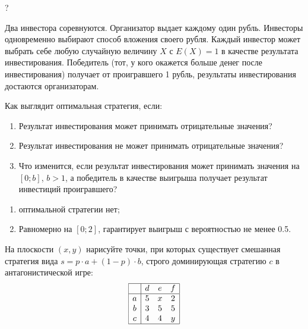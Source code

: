 \begin{problem}[Инвесторы.]
\begin{source}
\cite{ferguson:tn}?
\end{source}
Два инвестора соревнуются. Организатор выдает каждому один рубль. Инвесторы одновременно выбирают способ вложения своего рубля. Каждый инвестор может выбрать себе любую случайную величину $X$ с $E(X)=1$ в качестве результата инвестирования. Победитель (тот, у кого окажется больше денег после инвестирования) получает от проигравшего 1 рубль, результаты инвестирования достаются организаторам.

Как выглядит оптимальная стратегия, если:

\begin{enumerate}
\item Результат инвестирования может принимать отрицательные значения?

\item Результат инвестирования не может принимать отрицательные значения?

\item Что изменится, если результат инвестирования может принимать значения на $[0;b]$, $b>1$, а победитель в качестве выигрыша получает результат инвестиций проигравшего?
\end{enumerate}





\begin{sol}
\begin{enumerate}
\item оптимальной стратегии нет;
\item Равномерно на $[0;2]$, гарантирует выигрыш с вероятностью не менее 0.5.
\end{enumerate}
\end{sol}
\end{problem}


\begin{problem}[Гипербола]
На плоскости  $\left(x,y\right)$  нарисуйте точки, при которых существует смешанная стратегия вида  $s=p\cdot a+\left(1-p\right)\cdot b$, строго доминирующая стратегию  $c$  в антагонистической игре:
\[\begin{array}{|c|ccc|}  \hline {} & {d} & {e} & {f} \\  \hline {a} & {5} & {x} & {2} \\ {b} & {3} & {5} & {5} \\ {c} & {4} & {4} & {y} \\  \hline  \end{array}\]




\begin{sol}

\end{sol}
\end{problem}


